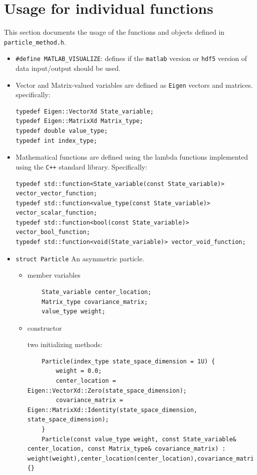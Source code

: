 \documentclass[10pt]{article} %
\begin{document}
\section{Usage for individual functions}
This section documents the usage of the functions and objects defined in \texttt{particle\_method.h}.
\begin{itemize}
\item
\texttt{\#define MATLAB\_VISUALIZE}: defines if the \texttt{matlab} version or \texttt{hdf5} version of data input/output should be used.
\item
Vector and Matrix-valued variables are defined as \texttt{Eigen} vectors and matrices. specifically: 
\begin{lstlisting}
typedef Eigen::VectorXd State_variable;
typedef Eigen::MatrixXd Matrix_type;
typedef double value_type;
typedef int index_type;
\end{lstlisting}
\item
Mathematical functions are defined using the lambda functions implemented using the \texttt{C++} standard library. Specifically: 
\begin{lstlisting}
typedef std::function<State_variable(const State_variable)> vector_vector_function;
typedef std::function<value_type(const State_variable)> vector_scalar_function;
typedef std::function<bool(const State_variable)> vector_bool_function;
typedef std::function<void(State_variable)> vector_void_function;
\end{lstlisting}
\item
\texttt{struct Particle} An asymmetric particle.
\begin{itemize}
\item
member variables

\begin{lstlisting}
	State_variable center_location;
	Matrix_type covariance_matrix;
	value_type weight;
\end{lstlisting}
\item
constructor

two initializing methods: 
\begin{lstlisting}
	Particle(index_type state_space_dimension = 1U) {
		weight = 0.0;
		center_location = Eigen::VectorXd::Zero(state_space_dimension);
		covariance_matrix = Eigen::MatrixXd::Identity(state_space_dimension, state_space_dimension);
	}
	Particle(const value_type weight, const State_variable& center_location, const Matrix_type& covariance_matrix) : weight(weight),center_location(center_location),covariance_matrix(covariance_matrix) {}
\end{lstlisting}


\end{itemize}
\end{itemize}
\end{document}
